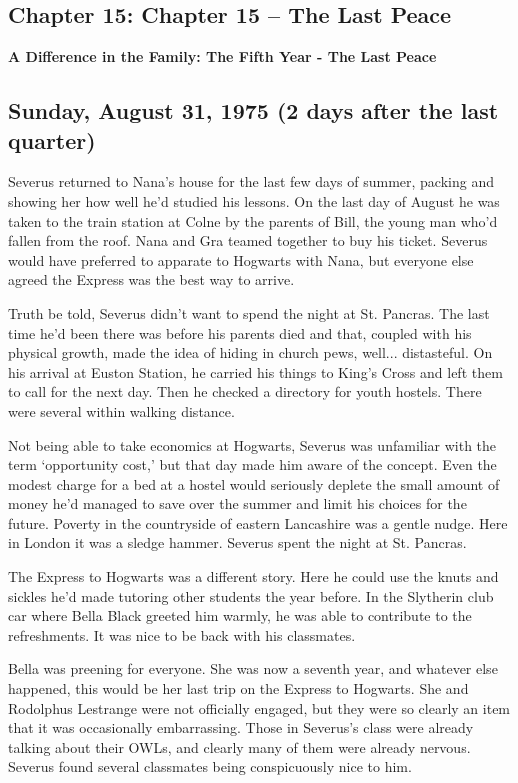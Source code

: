 \documentclass[a4paper,11pt]{article}
\begin{document}
\subsection{Chapter 15: Chapter 15 – The Last Peace}

\textbf{A Difference in the Family: The Fifth Year - The Last Peace}

\subsection{Sunday, August 31, 1975 (2 days after the last quarter)}

Severus returned to Nana's house for the last few days of summer, packing and showing her how well he'd studied his lessons. On the last day of August he was taken to the train station at Colne by the parents of Bill, the young man who'd fallen from the roof. Nana and Gra teamed together to buy his ticket. Severus would have preferred to apparate to Hogwarts with Nana, but everyone else agreed the Express was the best way to arrive.

Truth be told, Severus didn't want to spend the night at St. Pancras. The last time he'd been there was before his parents died and that, coupled with his physical growth, made the idea of hiding in church pews, well... distasteful. On his arrival at Euston Station, he carried his things to King's Cross and left them to call for the next day. Then he checked a directory for youth hostels. There were several within walking distance.

Not being able to take economics at Hogwarts, Severus was unfamiliar with the term `opportunity cost,' but that day made him aware of the concept. Even the modest charge for a bed at a hostel would seriously deplete the small amount of money he'd managed to save over the summer and limit his choices for the future. Poverty in the countryside of eastern Lancashire was a gentle nudge. Here in London it was a sledge hammer. Severus spent the night at St. Pancras.

The Express to Hogwarts was a different story. Here he could use the knuts and sickles he'd made tutoring other students the year before. In the Slytherin club car where Bella Black greeted him warmly, he was able to contribute to the refreshments. It was nice to be back with his classmates.

Bella was preening for everyone. She was now a seventh year, and whatever else happened, this would be her last trip on the Express to Hogwarts. She and Rodolphus Lestrange were not officially engaged, but they were so clearly an item that it was occasionally embarrassing. Those in Severus's class were already talking about their OWLs, and clearly many of them were already nervous. Severus found several classmates being conspicuously nice to him.
\end{document}
